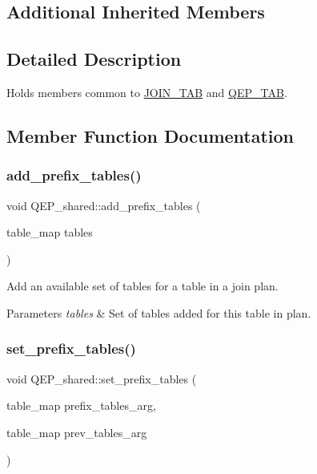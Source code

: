 \subsection*{Additional Inherited Members}


\subsection{Detailed Description}
Holds members common to \mbox{\hyperlink{classJOIN__TAB}{J\+O\+I\+N\+\_\+\+T\+AB}} and \mbox{\hyperlink{classQEP__TAB}{Q\+E\+P\+\_\+\+T\+AB}}. 

\subsection{Member Function Documentation}
\mbox{\label{classQEP__shared_a3cee2b471eae05ce298f5356a9d685eb}} 
\subsubsection{\texorpdfstring{add\+\_\+prefix\+\_\+tables()}{add\_prefix\_tables()}}
{\footnotesize\ttfamily void Q\+E\+P\+\_\+shared\+::add\+\_\+prefix\+\_\+tables (\begin{DoxyParamCaption}\item[{table\+\_\+map}]{tables }\end{DoxyParamCaption})\hspace{0.3cm}{\ttfamily [inline]}}

Add an available set of tables for a table in a join plan.


\begin{DoxyParams}{Parameters}
{\em tables} & Set of tables added for this table in plan. \\
\hline
\end{DoxyParams}
\mbox{\label{classQEP__shared_aa5920a37261a4d8c5d932450c8c8533a}} 
\subsubsection{\texorpdfstring{set\+\_\+prefix\+\_\+tables()}{set\_prefix\_tables()}}
{\footnotesize\ttfamily void Q\+E\+P\+\_\+shared\+::set\+\_\+prefix\+\_\+tables (\begin{DoxyParamCaption}\item[{table\+\_\+map}]{prefix\+\_\+tables\+\_\+arg,  }\item[{table\+\_\+map}]{prev\+\_\+tables\+\_\+arg }\end{DoxyParamCaption})\hspace{0.3cm}{\ttfamily [inline]}}

